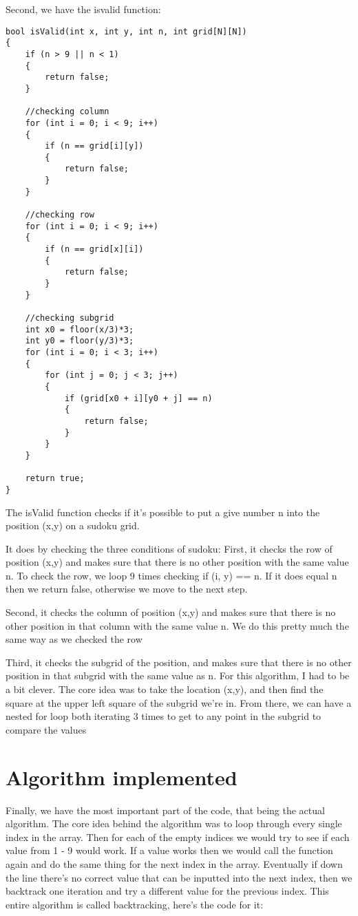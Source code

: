 \documentclass{article}
\begin{document}
Second, we have the isvalid function:
\begin{verbatim}
bool isValid(int x, int y, int n, int grid[N][N])
{
    if (n > 9 || n < 1)
    {
        return false;
    }

    //checking column
    for (int i = 0; i < 9; i++)
    {
        if (n == grid[i][y])
        {
            return false;
        }
    }
    
    //checking row
    for (int i = 0; i < 9; i++)
    {
        if (n == grid[x][i])
        {
            return false;
        }
    }

    //checking subgrid
    int x0 = floor(x/3)*3;
    int y0 = floor(y/3)*3;
    for (int i = 0; i < 3; i++)
    {
        for (int j = 0; j < 3; j++)
        {
            if (grid[x0 + i][y0 + j] == n)
            {
                return false;
            }   
        }
    }
    
    return true;
}
\end{verbatim}
The isValid function checks if it's possible to put a give number n
into the position (x,y) on a sudoku grid.

It does by checking the three conditions of sudoku:
First, it checks the row of position (x,y) and makes sure
that there is no other position with the same value n.
To check the row, we loop 9 times checking if (i, y) == n. 
If it does equal n then we return false, otherwise we move
to the next step.


Second, it checks the column of position (x,y) and makes sure
that there is no other position in that column with the same value n.
We do this pretty much the same way as we checked the row


Third, it checks the subgrid of the position, and makes sure
that there is no other position in that subgrid with the same 
value as n.
For this algorithm, I had to be a bit clever.
The core idea was to take the location (x,y), and then find
the square at the upper left square of the subgrid we're in.
From there, we can have a nested for loop both iterating 3 times
to get to any point in the subgrid to compare the values



\section{Algorithm implemented}
    Finally, we have the most important part of the code,
that being the actual algorithm.
The core idea behind the algorithm was to loop through every single
index in the array. Then for each of the empty indices we would try
to see if each value from 1 - 9 would work. If a value works
then we would call the function again and do the same thing for
the next index in the array. Eventually if down the line there's
no correct value that can be inputted into the next index, then 
we backtrack one iteration and try a different value for the previous index.
This entire algorithm is called backtracking, here's the code for it:
\end{document}

